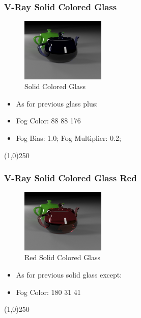 \begin{frame}
\frametitle{V-Ray Solid Colored Glass}
\begin{figure}
	\centering
	\includegraphics[height=3cm]{./Materials/SolidColoredGlass}
	\caption{Solid Colored Glass}
	\label{fig:SolidColoredGlass}
\end{figure}
\begin{itemize}
	\item As for previous glass plus:
	\item Fog Color: 88 88 176 
	\item Fog Bias: 1.0; Fog Multiplier: 0.2; 
\end{itemize}
\end{frame}
\begin{center}\line(1,0){250}\end{center}



\begin{frame}
\frametitle{V-Ray Solid Colored Glass Red}
\begin{figure}
	\centering
	\includegraphics[height=3cm]{./Materials/SolidColoredGlassDarkRed}
	\caption{Red Solid Colored Glass}
	\label{fig:RedSolidColoredGlass}
\end{figure}
\begin{itemize}
	\item As for previous solid glass except:
	\item Fog Color: 180 31 41 
\end{itemize}
\end{frame}
\begin{center}\line(1,0){250}\end{center}


